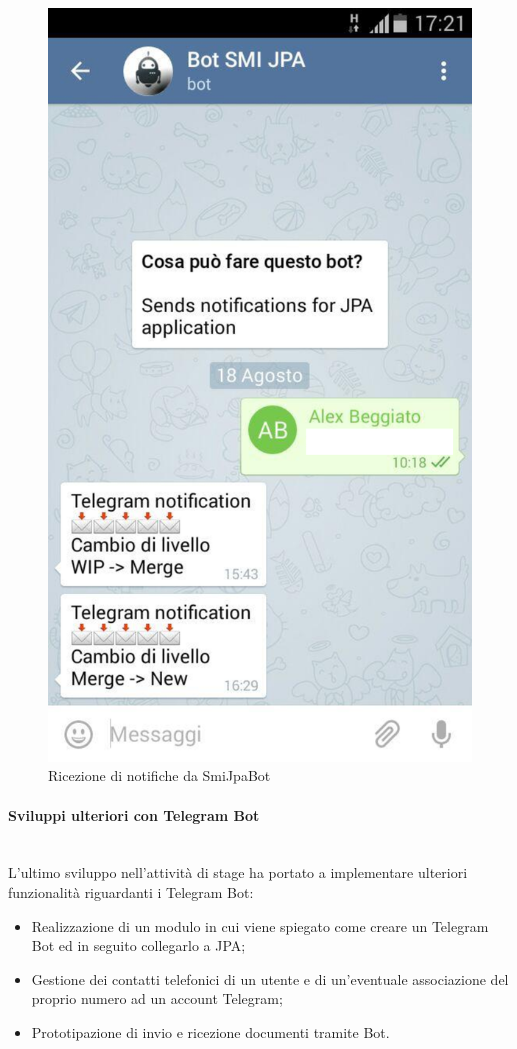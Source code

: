 \begin{figure}%
\centering
\includegraphics[width=.5\columnwidth]{immagini/telegram-screen}
\caption{Ricezione di notifiche da SmiJpaBot}
\label{fig:screen-telegram}%
\end{figure}

\paragraph{Sviluppi ulteriori con Telegram Bot} \mbox{} \\

L'ultimo sviluppo nell'attività di stage ha portato a implementare ulteriori
funzionalità riguardanti i Telegram Bot:

\begin{itemize}
\item Realizzazione di un modulo in cui viene spiegato come creare un Telegram
  Bot ed in seguito collegarlo a JPA;
\item Gestione dei contatti telefonici di un utente e di un'eventuale
  associazione del proprio numero ad un account Telegram;
\item Prototipazione di invio e ricezione documenti tramite Bot.
\end{itemize}

